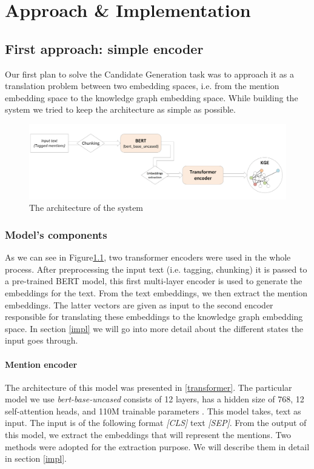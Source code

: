 \chapter{Approach \& Implementation}
\label{ch:Approach}

\section{First approach: simple encoder}
\label{MyModel}
Our first plan to solve the Candidate Generation task was to approach it as a translation problem between two embedding spaces, i.e. from the mention embedding space to the knowledge graph embedding space. 
While building the system we tried to keep the architecture as simple as possible.

\begin{figure}[h]
\centering
\includegraphics[width=16cm]{figures/MyImplementation.png}
\caption{The architecture of the system}
\label{My implementation}
\end{figure}

\subsection{Model's components}
As we can see in Figure\ref{My implementation}, two transformer encoders were used in the whole process. After preprocessing the input text (i.e. tagging, chunking) it is passed to a pre-trained BERT model, this first multi-layer encoder is used to generate the embeddings for the text. From the text embeddings, we then extract the mention embeddings. The latter vectors are given as input to the second encoder responsible for translating these embeddings to the knowledge graph embedding space. In section \ref{impl} we will go into more detail about the different states the input goes through.

\subsubsection{Mention encoder}
The architecture of this model was presented in \ref{transformer}. The particular model we use \textit{bert-base-uncased} consists of 12 layers, has a hidden size of 768, 12 self-attention heads, and 110M trainable parameters \cite{BERT}.\newline
This model takes, text as input. The input is of the following format \textit{[CLS]} text \textit{[SEP]}. 
From the output of this model, we extract the embeddings that will represent the mentions. Two methods were adopted for the extraction purpose. We will describe them in detail in section \ref{impl}.\newline

